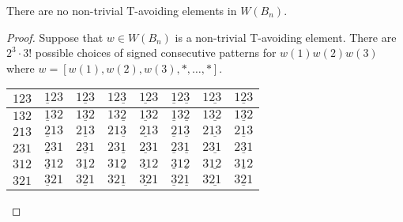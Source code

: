 \begin{theorem}\label{thm:classificationofB}
There are no non-trivial T-avoiding elements in $W(B_n)$.	


\begin{proof}
Suppose that $w \in W(B_n)$ is a non-trivial T-avoiding element. There are $2^3 \cdot 3!$ possible choices of signed consecutive patterns for $w(1)w(2)w(3)$ where $w=[w(1), w(2), w(3), \ast, \ldots, \ast]$.

\begin{center}
\begin{tabular}{|l|l|l|l|l|l|l|l|}
\hline
\cellcolor{blue!30}$123$ & \cellcolor{orange2!40}$\underline{1}23$ & \cellcolor{brown!50}$1\underline{2}3$ & \cellcolor{red!25}$12\underline{3}$ & \cellcolor{brown!50}$\underline{12}3$ & \cellcolor{red!25}$\underline{1}2\underline{3}$ & \cellcolor{turq!40}$1\underline{23}$ & \cellcolor{turq!40}$\underline{123}$ \\
\hline
\cellcolor{blue!30}$132$ & \cellcolor{orange2!40}$\underline{1}32$ & \cellcolor{brown!50}$1\underline{3}2$ & \cellcolor{red!25}$13\underline{2}$ & \cellcolor{brown!50}$\underline{13}2$ & \cellcolor{red!25}$\underline{1}3\underline{2}$ & \cellcolor{ggreen!50}$1\underline{32}$ & \cellcolor{ggreen!50}$\underline{132}$ \\
\hline
\cellcolor{blue!30}$213$ & \cellcolor{yellow!50}$\underline{2}13$ & \cellcolor{brown!50}$2\underline{1}3$ & \cellcolor{turq!40}$21\underline{3}$ & \cellcolor{yellow!50}$\underline{21}3$ & \cellcolor{red!25}$\underline{2}1\underline{3}$ & \cellcolor{turq!40}$2\underline{13}$ & \cellcolor{red!25}$\underline{213}$ \\
\hline
\cellcolor{red!25}$231$ & \cellcolor{purple2!50}$\underline{2}31$ & \cellcolor{ggreen!50}$2\underline{3}1$ & \cellcolor{red!25}$23\underline{1}$ & \cellcolor{brown!50}$\underline{23}1$ & \cellcolor{purple2!50}$\underline{2}3\underline{1}$ & \cellcolor{ggreen!50}$2\underline{31}$ & \cellcolor{brown!50}$\underline{231}$ \\
\hline
\cellcolor{ggreen!50}$312$ & \cellcolor{yellow!50}$\underline{3}12$ & \cellcolor{ggreen!50}$3\underline{1}2$ &\cellcolor{turq!40}$31\underline{2}$ & \cellcolor{yellow!50}$\underline{31}2$ & \cellcolor{yellow!50}$\underline{3}1\underline{2}$ & \cellcolor{turq!40}$3\underline{12}$ & \cellcolor{yellow!50}$\underline{312}$ \\
\hline
\cellcolor{turq!40}$321$ & \cellcolor{yellow!50}$\underline{3}21$ & \cellcolor{ggreen!50}$3\underline{2}1$ & \cellcolor{turq!40}$32\underline{1}$ & \cellcolor{yellow!50}$\underline{32}1$ & \cellcolor{yellow!50}$\underline{3}2\underline{1}$ & \cellcolor{ggreen!50}$3\underline{21}$ & \cellcolor{yellow!50}$\underline{321}$\\
\hline
\end{tabular}
\end{center}


\end{proof}
\end{theorem}
